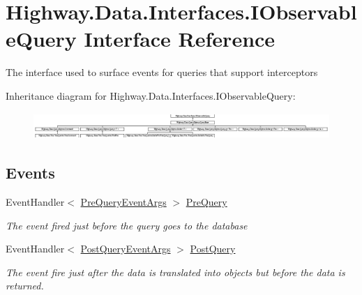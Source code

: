 \hypertarget{interface_highway_1_1_data_1_1_interfaces_1_1_i_observable_query}{\section{Highway.\-Data.\-Interfaces.\-I\-Observable\-Query Interface Reference}
\label{interface_highway_1_1_data_1_1_interfaces_1_1_i_observable_query}
}


The interface used to surface events for queries that support interceptors  


Inheritance diagram for Highway.\-Data.\-Interfaces.\-I\-Observable\-Query\-:\begin{figure}[H]
\begin{center}
\leavevmode
\includegraphics[height=1.000000cm]{interface_highway_1_1_data_1_1_interfaces_1_1_i_observable_query}
\end{center}
\end{figure}
\subsection*{Events}
\begin{DoxyCompactItemize}
\item 
Event\-Handler$<$ \hyperlink{class_highway_1_1_data_1_1_interceptors_1_1_events_1_1_pre_query_event_args}{Pre\-Query\-Event\-Args} $>$ \hyperlink{interface_highway_1_1_data_1_1_interfaces_1_1_i_observable_query_a1687e8dccf74ef87f98fe8ef6f1c99c3}{Pre\-Query}
\begin{DoxyCompactList}\small\item\em The event fired just before the query goes to the database \end{DoxyCompactList}\item 
Event\-Handler$<$ \hyperlink{class_highway_1_1_data_1_1_interceptors_1_1_events_1_1_post_query_event_args}{Post\-Query\-Event\-Args} $>$ \hyperlink{interface_highway_1_1_data_1_1_interfaces_1_1_i_observable_query_ac8cff5ce936c3611f965796ba9707c49}{Post\-Query}
\begin{DoxyCompactList}\small\item\em The event fire just after the data is translated into objects but before the data is returned. \end{DoxyCompactList}\end{DoxyCompactItemize}


